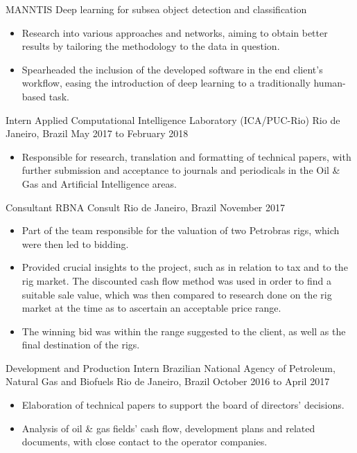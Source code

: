 \cvsubjob
    {MANNTIS}
    {Deep learning for subsea object detection and classification}

\begin{itemize}
    \item Research into various approaches and networks, aiming to obtain better results by tailoring the methodology to
    the data in question.
    \item Spearheaded the inclusion of the developed software in the end client's workflow, easing the introduction of
    deep learning to a traditionally human-based task.
\end{itemize}

\cvjob
    {Intern}
    {Applied Computational Intelligence Laboratory (ICA/PUC-Rio)}
    {Rio de Janeiro, Brazil}
    {May 2017 to February 2018}

\begin{itemize}
    \item Responsible for research, translation and formatting of technical papers, with further submission and
    acceptance to journals and periodicals in the Oil \& Gas and Artificial Intelligence areas.
\end{itemize}

\cvjob
    {Consultant}
    {RBNA Consult}
    {Rio de Janeiro, Brazil}
    {November 2017}

\begin{itemize}
    \item Part of the team responsible for the valuation of two Petrobras rigs, which were then led to bidding.
    \item Provided crucial insights to the project, such as in relation to tax and to the rig market.
    The discounted cash flow method was used in order to find a suitable sale value, which was then compared to research
    done on the rig market at the time as to ascertain an acceptable price range.
    \item The winning bid was within the range suggested to the client, as well as the final destination of the rigs.

\end{itemize}

\cvjob
    {Development and Production Intern}
    {Brazilian National Agency of Petroleum, Natural Gas and Biofuels}
    {Rio de Janeiro, Brazil}
    {October 2016 to April 2017}

\begin{itemize}
    \item Elaboration of technical papers to support the board of directors' decisions.
    \item Analysis of oil \& gas fields' cash flow, development plans and related documents, with close contact to the
    operator companies.
\end{itemize}

